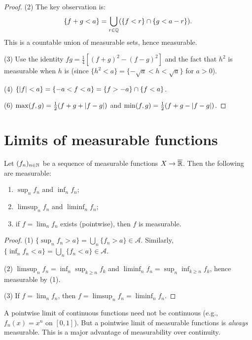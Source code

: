 \begin{proof}
(2) The key observation is:
\[
\{f + g < a\} = \bigcup_{r \in \mathbb{Q}} (\{f < r\} \cap \{g < a - r\}).
\]
This is a countable union of measurable sets, hence measurable.

(3) Use the identity $fg = \frac{1}{4}[(f+g)^2 - (f-g)^2]$ and the fact that $h^2$
is measurable when $h$ is (since $\{h^2 < a\} = \{-\sqrt{a} < h < \sqrt{a}\}$ for
$a > 0$).

(4) $\{\left| f \right| < a\} = \{-a < f < a\} = \{f > -a\} \cap \{f < a\}$.

(6) $\max(f, g) = \frac{1}{2}(f + g + \left| f - g \right|)$ and
$\min(f, g) = \frac{1}{2}(f + g - \left| f - g \right|)$.
\end{proof}

\section{Limits of measurable functions}

\begin{theorem}
\label{thm:limit_stability}
Let $(f_n)_{n \in \mathbb{N}}$ be a sequence of measurable functions
$X \to \overline{\mathbb{R}}$. Then the following are measurable:
\begin{enumerate}
    \item $\sup_n f_n$ and $\inf_n f_n$;
    \item $\limsup_n f_n$ and $\liminf_n f_n$;
    \item if $f = \lim_n f_n$ exists (pointwise), then $f$ is measurable.
\end{enumerate}
\end{theorem}

\begin{proof}
(1) $\{\sup_n f_n > a\} = \bigcup_n \{f_n > a\} \in \mathcal{A}$. Similarly,
$\{\inf_n f_n < a\} = \bigcup_n \{f_n < a\} \in \mathcal{A}$.

(2) $\limsup_n f_n = \inf_n \sup_{k \geq n} f_k$ and
$\liminf_n f_n = \sup_n \inf_{k \geq n} f_k$, hence measurable by (1).

(3) If $f = \lim_n f_n$, then $f = \limsup_n f_n = \liminf_n f_n$.
\end{proof}

\begin{warning}[title=\textbf{Contrast with continuity}]
A pointwise limit of continuous functions need not be continuous (e.g.,
$f_n(x) = x^n$ on $[0,1]$). But a pointwise limit of measurable functions is
\emph{always} measurable. This is a major advantage of measurability over continuity.
\end{warning}

